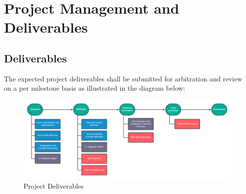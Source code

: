 \documentclass[12pt]{article}
\begin{document}
	\section{Project Management and Deliverables}
	\subsection{Deliverables}
	The expected project deliverables shall be submitted for arbitration and review on a per milestone basis as illustrated in the diagram below: 
	\vspace{0.5 cm}
	\begin{figure}[H]
		\centering
		\includegraphics[width=\textwidth]{Images/Pipelines/Mele-Deliverables.png}
		\caption{Project Deliverables}
		\label{fig:DELIVERABLES}
	\end{figure}
	
\end{document}
